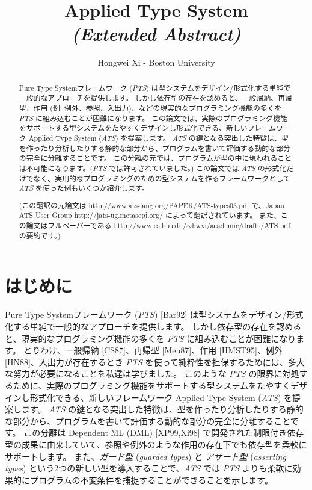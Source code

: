 \documentclass[submit,techreq,noauthor,onecolumn]{ipsj}
\begin{document}
\title{Applied Type System \\ {\huge\it (Extended Abstract)}}

\author{Hongwei Xi - Boston University}{}{}

\begin{abstract}
Pure Type Systemフレームワーク ({\it PTS}) は型システムをデザイン/形式化する単純で一般的なアプローチを提供します。
しかし依存型の存在を認めると、一般帰納、再帰型、作用 (例: 例外、参照、入出力)、などの現実的なプログラミング機能の多くを {\it PTS} に組み込むことが困難になります。
この論文では、実際のプログラミング機能をサポートする型システムをたやすくデザインし形式化できる、新しいフレームワーク Applied Type System ({\it ATS}) を提案します。
{\it ATS} の鍵となる突出した特徴は、型を作ったり分析したりする静的な部分から、プログラムを書いて評価する動的な部分の完全に分離することです。
この分離の元では、プログラムが型の中に現われることは不可能になります。({\it PTS} では許可されていました。)
この論文では {\it ATS} の形式化だけでなく、実用的なプログラミングのための型システムを作るフレームワークとして {\it ATS} を使った例もいくつか紹介します。

\vspace{2mm}

(この翻訳の元論文は http://www.ats-lang.org/PAPER/ATS-types03.pdf で、Japan ATS User Group http://jats-ug.metasepi.org/ によって翻訳されています。
また、この論文はフルペーパーである http://www.cs.bu.edu/$\sim$hwxi/academic/drafts/ATS.pdf の要約です。)
\end{abstract}

\maketitle
\thispagestyle{empty}

\section{はじめに}

Pure Type Systemフレームワーク ({\it PTS}) [Bar92] は型システムをデザイン/形式化する単純で一般的なアプローチを提供します。
しかし依存型の存在を認めると、現実的なプログラミング機能の多くを {\it PTS} に組み込むことが困難になります。
とりわけ、一般帰納 [CS87]、再帰型 [Men87]、作用 [HMST95]、例外 [HN88]、入出力が存在するとき {\it PTS} を使って純粋性を担保するためには、多大な努力が必要になることを私達は学びました。
このような {\it PTS} の限界に対処するために、実際のプログラミング機能をサポートする型システムをたやすくデザインし形式化できる、新しいフレームワーク Applied Type System ({\it ATS}) を提案します。
{\it ATS} の鍵となる突出した特徴は、型を作ったり分析したりする静的な部分から、プログラムを書いて評価する動的な部分の完全に分離することです。
この分離は Dependent ML (DML) [XP99,Xi98] で開発された制限付き依存型の成果に由来していて、参照や例外のような作用の存在下でも依存型を柔軟にサポートします。
また、{\it ガード型} ({\it guarded types}) と {\it アサート型} ({\it asserting types}) という2つの新しい型を導入することで、{\it ATS} では {\it PTS} よりも柔軟に効果的にプログラムの不変条件を捕捉することができることを示します。
\end{document}
